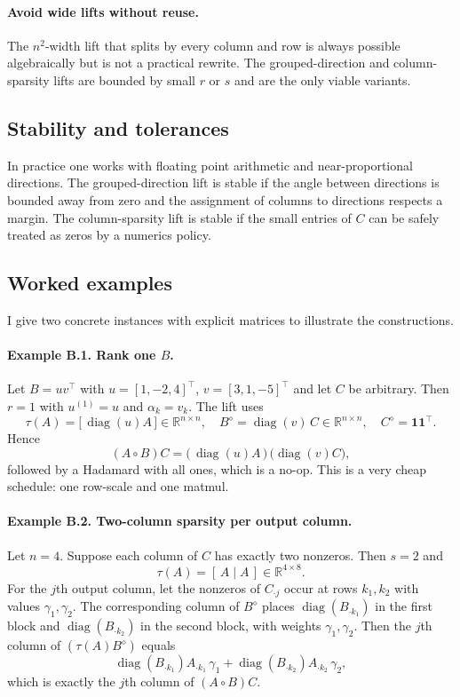 \documentclass[11pt,a4paper]{article}
\theoremstyle{definition}
\newcommand{\R}{\mathbb{R}}
\newcommand{\Had}{\circ}
\newcommand{\diag}{\operatorname{diag}}
\begin{document}
\paragraph{Avoid wide lifts without reuse.}
The $n^2$-width lift that splits by every column and row is always possible algebraically but is not a practical rewrite. The grouped-direction and column-sparsity lifts are bounded by small $r$ or $s$ and are the only viable variants.

\subsection{Stability and tolerances}
In practice one works with floating point arithmetic and near-proportional directions. The grouped-direction lift is stable if the angle between directions is bounded away from zero and the assignment of columns to directions respects a margin. The column-sparsity lift is stable if the small entries of $C$ can be safely treated as zeros by a numerics policy.

\subsection{Worked examples}
I give two concrete instances with explicit matrices to illustrate the constructions.

\paragraph{Example B.1. Rank one $B$.}
Let $B=uv^\top$ with $u=[1,-2,4]^\top$, $v=[3,1,-5]^\top$ and let $C$ be arbitrary. Then $r=1$ with $u^{(1)}=u$ and $\alpha_k=v_k$. The lift uses
\[
\tau(A) = \big[\, \diag(u) A \,\big] \in \R^{n\times n},\quad
B^\diamond = \diag(v)\,C \in \R^{n\times n},\quad
C^\diamond=\bm{1}\bm{1}^\top.
\]
Hence
\[
(A \Had B) C = \big(\,\diag(u) A\,\big) \, \big(\diag(v) C\big),
\]
followed by a Hadamard with all ones, which is a no-op. This is a very cheap schedule: one row-scale and one matmul.

\paragraph{Example B.2. Two-column sparsity per output column.}
Let $n=4$. Suppose each column of $C$ has exactly two nonzeros. Then $s=2$ and
\[
\tau(A) = [\, A \mid A \,] \in \R^{4\times 8}.
\]
For the $j$th output column, let the nonzeros of $C_{\cdot j}$ occur at rows $k_1,k_2$ with values $\gamma_1,\gamma_2$. The corresponding column of $B^\diamond$ places $\diag(B_{\cdot k_1})$ in the first block and $\diag(B_{\cdot k_2})$ in the second block, with weights $\gamma_1,\gamma_2$. Then the $j$th column of $(\tau(A) B^\diamond)$ equals
\[
\diag(B_{\cdot k_1}) A_{\cdot k_1}\, \gamma_1 + \diag(B_{\cdot k_2}) A_{\cdot k_2}\, \gamma_2,
\]
which is exactly the $j$th column of $(A \Had B) C$.
\end{document}
